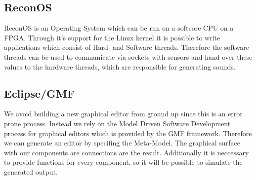 	  \subsection{ReconOS}
		ReconOS is an Operating System which can be run on a softcore CPU on a FPGA. Through it's support for the Linux kernel it is possible to write applications which consist of Hard- and Software threads. Therefore the software threads can be used to communicate via sockets with sensors and hand over these values to the hardware threads, which are responsible for generating sounds.
	  \subsection{Eclipse/GMF}
		We avoid building a new graphical editor from ground up since this is an error prone process. Instead we rely on the Model Driven Software Development process for graphical editors which is provided by the GMF framework. Therefore we can generate an editor by specifing the Meta-Model. The graphical surface with our components are connections are the result. Additionally it is neccessary to provide functions for every component, so it will be possible to simulate the generated output.
      